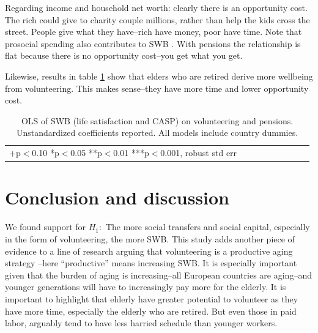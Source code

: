 \documentclass[10pt, letterpaper]{article}
\begin{document}
\begin{spacing}{1.4}

Regarding income and household net worth: clearly there is an opportunity cost. The rich could give to charity couple
millions, rather than help the kids cross the street. People give what they
have--rich have money, poor have time.  Note that prosocial spending also
contributes to SWB \citep{aknin13}.
%
With pensions the relationship is flat because there is no opportunity cost--you
get what you get.



Likewise, results in table \ref{regEw6} show that elders
who are retired derive more wellbeing from volunteering. This makes sense--they
have more time and lower opportunity cost. 
%

\begin{spacing}{.9}
\begin{table}[H]\centering \caption{OLS of SWB  (life satisfaction and CASP) on
    volunteering and pensions.  Unstandardized coefficients reported. All models
  include country dummies.}  \begin{scriptsize} \begin{tabular}{p{1.8in}p{.5in}p{.5in}p{.5in}p{.5in}|p{.5in}p{.5in}p{.5in}p{.5in}p{.5in}p{.4in}p{.5in}p{.4in}}\hline 
      \hline\multicolumn{5}{l}{+p$<$0.10 *p$<$0.05 **p$<$0.01 ***p$<$0.001,
        robust std err} \end{tabular}\label{regEw6} \end{scriptsize}\end{table}
\end{spacing}





\section*{Conclusion and discussion}

We found support for $H_1:$ The more social transfers and social capital,
especially in the form of volunteering, the more SWB.
This study adds another piece of evidence to a line of research arguing that
volunteering is a productive aging strategy
\citep[e.g.,][]{wilson12B,hank09}--here ``productive'' means increasing SWB.
It is especially important given that the burden of aging %
 is increasing--all European countries are aging--and younger generations will
 have to increasingly pay more for the elderly. It is important to highlight that elderly have greater potential to volunteer as
they have more time, especially the elderly who are retired. But even those in
paid labor, arguably tend to have less harried schedule than younger workers.



\end{spacing}
\end{document}
